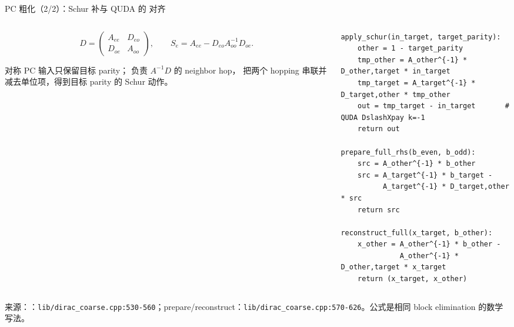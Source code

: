 \documentclass[UTF8,aspectratio=169,11pt]{ctexbeamer}
\newcommand{\source}[1]{\vspace{0.05em}\par{\raggedright\scriptsize\color{muted}来源：#1\par}}
\newcommand{\codepath}[1]{\nolinkurl{#1}}
\begin{document}
\begin{frame}[fragile,t]{PC 粗化（2/2）：Schur 补与 QUDA 的 \texttt{} 对齐}
  \begin{columns}[T,totalwidth=\textwidth]
    \begin{column}{0.45\textwidth}
      \begin{equation*}
        D=\begin{pmatrix}A_{ee}&D_{eo}\\D_{oe}&A_{oo}\end{pmatrix},
        \qquad
        S_e=A_{ee}-D_{eo}A_{oo}^{-1}D_{oe}.
      \end{equation*}
      \begin{block}{对称 PC}
        输入只保留目标 parity；\texttt{} 负责 \(A^{-1}D\) 的 neighbor hop，\texttt{} 把两个 hopping 串联并减去单位项，得到目标 parity 的 Schur 动作。
      \end{block}
    \end{column}
    \begin{column}{0.51\textwidth}
      \begin{lstlisting}[firstnumber=1]
apply_schur(in_target, target_parity):
    other = 1 - target_parity
    tmp_other = A_other^{-1} * D_other,target * in_target
    tmp_target = A_target^{-1} * D_target,other * tmp_other
    out = tmp_target - in_target       # QUDA DslashXpay k=-1
    return out

prepare_full_rhs(b_even, b_odd):
    src = A_other^{-1} * b_other
    src = A_target^{-1} * b_target -
          A_target^{-1} * D_target,other * src
    return src

reconstruct_full(x_target, b_other):
    x_other = A_other^{-1} * b_other -
              A_other^{-1} * D_other,target * x_target
    return (x_target, x_other)
      \end{lstlisting}
    \end{column}
  \end{columns}
  \source{\texttt{}：\codepath{lib/dirac_coarse.cpp:530-560}；prepare/reconstruct：\codepath{lib/dirac_coarse.cpp:570-626}。公式是相同 block elimination 的数学写法。}
\end{frame}
\end{document}

